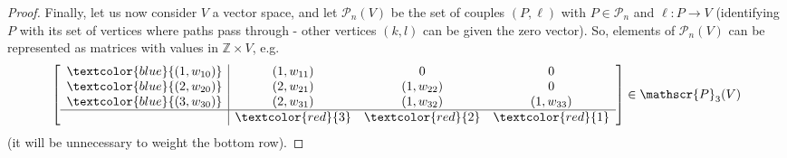 \documentclass[11pt, reqno]{amsart}
\theoremstyle{definition}
\numberwithin{equation}{section}
\def\Z{\mathbb Z}
\newcommand{\msP}{\mathscr{P}}
\begin{document}
\begin{proof}
Finally, let us now consider $V$ a vector space, and let $\msP_n(V)$ be the set of couples $(P,\ell)$ with $P \in \msP_n$ and $\ell \colon P \rightarrow V$ (identifying $P$ with its set of vertices where paths pass through - other vertices $(k,l)$ can be given the zero vector). So, elements of $\msP_n(V)$ can be represented as matrices with values in $\Z\times V$, e.g.\
\[
\left[
\begin{array}{c|ccc}
  \textcolor{blue}{(1,w_{10})}  & (1,w_{11}) & 0 &0 \\ \textcolor{blue}{(2,w_{20})} & (2,w_{21}) & (1,w_{22}) & 0 \\ \textcolor{blue}{(3,w_{30})} & (2,w_{31}) & (1,w_{32}) &(1,w_{33}) \\
  \hline  & \textcolor{red}{3} & \textcolor{red}{2} & \textcolor{red}{1} 
\end{array}
\right] \in \msP_3(V)
\]
(it will be unnecessary to weight the bottom row). 


\end{proof}
\end{document}
